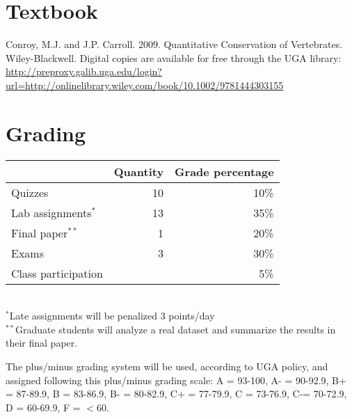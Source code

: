 \documentclass[12pt]{article}
\begin{document}
\vspace{-2mm}
\section*{\normalsize Textbook}
\vspace{-4mm}
Conroy, M.J. and J.P. Carroll. 2009. Quantitative Conservation of
Vertebrates. Wiley-Blackwell.
Digital copies are available for free through the UGA library:
{\footnotesize \url{http://preproxy.galib.uga.edu/login?url=http://onlinelibrary.wiley.com/book/10.1002/9781444303155}}

\vspace{-2mm}
\section*{\normalsize Grading}
\vspace{-4mm}
\begin{center}
  \begin{tabular}[h!]{lrr}
    \hline
                              & Quantity & Grade percentage      \\
    \hline
    Quizzes                   & 10       & 10\%                  \\
    Lab assignments$^*$       & 13       & 35\%                  \\
    Final paper$^{**}$         & 1        & 20\%                  \\
    Exams                     & 3        & 30\%                  \\
    Class participation       &          & 5\%                   \\
    \hline
  \end{tabular}                                                  \\
  \small
\hspace{0mm} $^*$Late assignments will be penalized 3 points/day \\ 
\hspace{0mm} $^{**}$Graduate students will analyze a real dataset and
summarize the results in their final paper.
\end{center}
The plus/minus grading system will be used, according to UGA policy,
and assigned following this plus/minus grading scale: A = 93-100, A- =
90-92.9, B+ = 87-89.9, B = 83-86.9, B- = 80-82.9, C+ = 77-79.9, C =
73-76.9, C-= 70-72.9, D = 60-69.9, F = $<$60. 


\vspace{-2mm}
\end{document}
